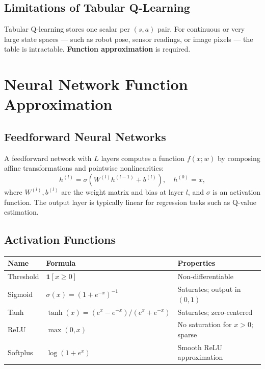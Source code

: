 \documentclass[11pt,a4paper]{article}
\theoremstyle{definition}
\theoremstyle{plain}
\theoremstyle{remark}
\begin{document}
\subsection{Limitations of Tabular Q-Learning}

Tabular Q-learning stores one scalar per $(s, a)$ pair. For continuous or very large state spaces — such as robot pose, sensor readings, or image pixels — the table is intractable. \textbf{Function approximation} is required.

\section{Neural Network Function Approximation}

\subsection{Feedforward Neural Networks}

A feedforward network with $L$ layers computes a function $f(x; w)$ by composing affine transformations and pointwise nonlinearities:
\[
    h^{(l)} = \sigma\!\left(W^{(l)} h^{(l-1)} + b^{(l)}\right), \quad h^{(0)} = x,
\]
where $W^{(l)}, b^{(l)}$ are the weight matrix and bias at layer $l$, and $\sigma$ is an activation function. The output layer is typically linear for regression tasks such as Q-value estimation.

\subsection{Activation Functions}

\begin{center}
\begin{tabular}{lll}
\hline
\textbf{Name} & \textbf{Formula} & \textbf{Properties} \\
\hline
Threshold  & $\mathbf{1}[x \ge 0]$                                     & Non-differentiable \\
Sigmoid    & $\sigma(x) = (1 + e^{-x})^{-1}$                          & Saturates; output in $(0,1)$ \\ %
Tanh       & $\tanh(x) = (e^x - e^{-x})/(e^x + e^{-x})$              & Saturates; zero-centered \\
ReLU       & $\max(0, x)$                                              & No saturation for $x>0$; sparse \\
Softplus   & $\log(1 + e^x)$                                           & Smooth ReLU approximation \\
\hline
\end{tabular}
\end{center}
\end{document}

